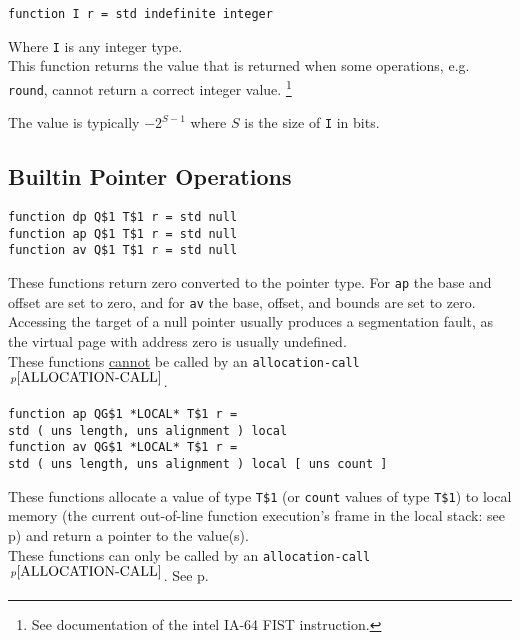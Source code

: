 \documentclass[12pt]{article}
\newcommand{\pagref}[1]{p\pageref{#1}}
\newcommand{\pagnote}[1]{$\,^{p\pageref{#1}}$}
\newenvironment{indpar}[1][0.3in]%
	{\begin{list}{}%
		     {\setlength{\itemsep}{0in}%
		      \setlength{\topsep}{0in}%
		      \setlength{\parsep}{1ex}%
		      \setlength{\labelwidth}{#1}%
		      \setlength{\leftmargin}{#1}%
		      \addtolength{\leftmargin}{\labelsep}}%
	 \item}%
	{\end{list}}
\begin{document}
{\tt function I r = std indefinite integer}%
\label{INDEFINITE-INTEGER}
\begin{indpar}
Where {\tt I} is any integer type.
\\[1ex]
This function returns the value that is returned when
some operations, e.g. {\tt round},
cannot return a correct integer value.%
\footnote{See documentation of the intel IA-64 FIST instruction.}

The value is typically $-2^{S-1}$ where $S$ is the size of {\tt I} in bits.
\end{indpar}

\subsection{Builtin Pointer Operations}
\label{BUILTIN-POINTER-OPERATIONS}

{\tt function dp Q\$1 T\$1 r = std null}\label{NULL} \\
{\tt function ap Q\$1 T\$1 r = std null} \\
{\tt function av Q\$1 T\$1 r = std null}
\begin{indpar}
These functions return zero converted to the pointer type.
For {\tt ap} the base and offset are set to zero, and for
{\tt av} the base, offset, and bounds are set to zero.
\\[1ex]
Accessing the target of a null pointer usually produces
a segmentation fault, as the virtual page with address zero
is usually undefined.
\\[1ex]
These functions \underline{cannot} be called by an
{\tt allocation-call}\pagnote{ALLOCATION-CALL}.
\end{indpar}

{\tt function ap QG\$1 *LOCAL* T\$1 r = \\
\hspace*{1in}std ( uns length, uns alignment ) local}%
\label{LOCAL} \\
{\tt function av QG\$1 *LOCAL* T\$1 r = \\
\hspace*{1in}std ( uns length, uns alignment ) local [ uns count ]}
\begin{indpar}
These functions allocate a value of type {\tt T\$1}
(or {\tt count} values of type {\tt T\$1}) to local
memory (the current out-of-line function execution's frame in the local stack:
see \pagref{OUT-OF-LINE-LOCALS})
and return a pointer to the value(s).
\\[1ex]
These functions can only be called by an
{\tt allocation-call}\pagnote{ALLOCATION-CALL}.
See \pagref{ALLOCATION-CALLS}.
\end{indpar}
\end{document}
